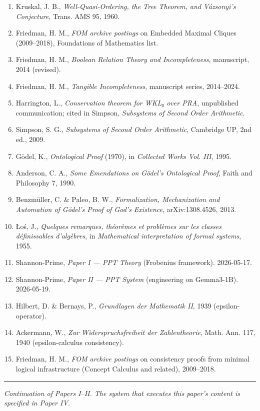 \documentclass[
  11pt,
]{article}
\providecommand{\tightlist}{%
  \setlength{\itemsep}{0pt}\setlength{\parskip}{0pt}}
\begin{document}
\begin{enumerate}
\def\labelenumi{\arabic{enumi}.}
\tightlist
\item
  Kruskal, J. B., \emph{Well-Quasi-Ordering, the Tree Theorem, and
  Vázsonyi's Conjecture}, Trans. AMS 95, 1960.
\item
  Friedman, H. M., \emph{FOM archive postings} on Embedded Maximal
  Cliques (2009--2018), Foundations of Mathematics list.
\item
  Friedman, H. M., \emph{Boolean Relation Theory and Incompleteness},
  manuscript, 2014 (revised).
\item
  Friedman, H. M., \emph{Tangible Incompleteness}, manuscript series,
  2014--2024.
\item
  Harrington, L., \emph{Conservation theorem for WKL₀ over PRA},
  unpublished communication; cited in Simpson, \emph{Subsystems of
  Second Order Arithmetic}.
\item
  Simpson, S. G., \emph{Subsystems of Second Order Arithmetic},
  Cambridge UP, 2nd ed., 2009.
\item
  Gödel, K., \emph{Ontological Proof} (1970), in \emph{Collected Works
  Vol. III}, 1995.
\item
  Anderson, C. A., \emph{Some Emendations on Gödel's Ontological Proof},
  Faith and Philosophy 7, 1990.
\item
  Benzmüller, C. \& Paleo, B. W., \emph{Formalization, Mechanization and
  Automation of Gödel's Proof of God's Existence}, arXiv:1308.4526,
  2013.
\item
  Łoś, J., \emph{Quelques remarques, théorèmes et problèmes sur les
  classes définissables d'algèbres}, in \emph{Mathematical
  interpretation of formal systems}, 1955.
\item
  Shannon-Prime, \emph{Paper I --- PPT Theory} (Frobenius framework).
  2026-05-17.
\item
  Shannon-Prime, \emph{Paper II --- PPT System} (engineering on
  Gemma3-1B). 2026-05-19.
\item
  Hilbert, D. \& Bernays, P., \emph{Grundlagen der Mathematik II}, 1939
  (epsilon-operator).
\item
  Ackermann, W., \emph{Zur Widerspruchsfreiheit der Zahlentheorie},
  Math. Ann. 117, 1940 (epsilon-calculus consistency).
\item
  Friedman, H. M., \emph{FOM archive postings} on consistency proofs
  from minimal logical infrastructure (Concept Calculus and related),
  2009--2018.
\end{enumerate}

\begin{center}\rule{0.5\linewidth}{0.5pt}\end{center}

\emph{Continuation of Papers I--II. The system that executes this
paper's content is specified in Paper IV.}
\end{document}
